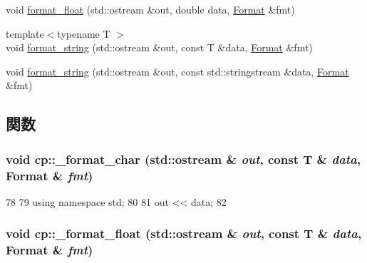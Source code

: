 \begin{DoxyCompactItemize}
\item 
void \hyperlink{namespacecp_a5e15926263e49c0f424851264822744f}{format\_\-float} (std::ostream \&out, double data, \hyperlink{structcp_1_1Format}{Format} \&fmt)
\item 
{\footnotesize template$<$typename T $>$ }\\void \hyperlink{namespacecp_a302829141f210fff0ccc4f6c5a5d78fd}{format\_\-string} (std::ostream \&out, const T \&data, \hyperlink{structcp_1_1Format}{Format} \&fmt)
\item 
void \hyperlink{namespacecp_a5faf6112477905a24772474cd93f884c}{format\_\-string} (std::ostream \&out, const std::stringstream \&data, \hyperlink{structcp_1_1Format}{Format} \&fmt)
\end{DoxyCompactItemize}


\subsection{関数}
\hypertarget{namespacecp_a94c381cbbf87a4688d2f47e52e03b867}{
\subsubsection[{\_\-format\_\-char}]{\setlength{\rightskip}{0pt plus 5cm}void cp::\_\-format\_\-char (std::ostream \& {\em out}, \/  const T \& {\em data}, \/  Format \& {\em fmt})}}
\label{namespacecp_a94c381cbbf87a4688d2f47e52e03b867}



\begin{DoxyCode}
78 {
79     using namespace std;
80 
81     out << data;
82 }
\end{DoxyCode}
\hypertarget{namespacecp_a9eacdefc85b69ce28ce1ba0d7e180db1}{
\subsubsection[{\_\-format\_\-float}]{\setlength{\rightskip}{0pt plus 5cm}void cp::\_\-format\_\-float (std::ostream \& {\em out}, \/  const T \& {\em data}, \/  Format \& {\em fmt})}}
\label{namespacecp_a9eacdefc85b69ce28ce1ba0d7e180db1}



